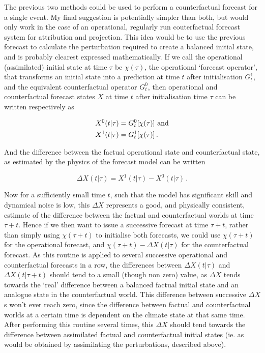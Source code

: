       The previous two methods could be used to perform a counterfactual forecast for a single event. My final suggestion is potentially simpler than both, but would only work in the case of an operational, regularly run couterfactual forecast system for attribution and projection. This idea would be to use the previous forecast to calculate the perturbation required to create a balanced initial state, and is probably clearest expressed mathematically. If we call the operational (assimilated) initial state at time $\tau$ be $\chi(\tau)$, the operational `forecast operator', that transforms an initial state into a prediction at time $t$ after initialisation $G_t^1$, and the equivalent counterfactual operator $G_t^0$, then operational and counterfactual forecast states $X$ at time $t$ after initialisation time $\tau$ can be written respectively as

      \begin{align*}
        X^0(t|\tau) &= G_t^0[\chi(\tau)] \ \textnormal{and}\\
        X^1(t|\tau) &= G_t^1[\chi(\tau)]\,.
      \end{align*}

      \noindent And the difference between the factual operational state and counterfactual state, as estimated by the physics of the forecast model can be written

      \begin{equation}
        \Delta X(t|\tau) = X^1(t|\tau) - X^0(t|\tau)\,.
      \end{equation}

      \noindent Now for a sufficiently small time $t$, such that the model has significant skill and dynamical noise is low, this $\Delta X$ represents a good, and physically consistent, estimate of the difference between the factual and counterfactual worlds at time $\tau + t$. Hence if we then want to issue a successive forecast at time $\tau + t$, rather than simply using $\chi(\tau+t)$ to initialise both forecasts, we could use $\chi(\tau+t)$ for the operational forecast, and $\chi(\tau+t) - \Delta X(t|\tau)$ for the counterfactual forecast. As this routine is applied to several successive operational and counterfactual forecasts in a row, the differences between $\Delta X(t|\tau)$ and $\Delta X(t|\tau+t)$ should tend to a small (though non zero) value, as $\Delta X$ tends towards the `real' difference between a balanced factual initial state and an analogue state in the counterfactual world. This difference between successive $\Delta X$s won't ever reach zero, since the difference between factual and counterfactual worlds at a certain time is dependent on the climate state at that same time. After performing this routine several times, this $\Delta X$ should tend towards the difference between assimilated factual and counterfactual initial states (ie. as would be obtained by assimilating the perturbations, described above).

